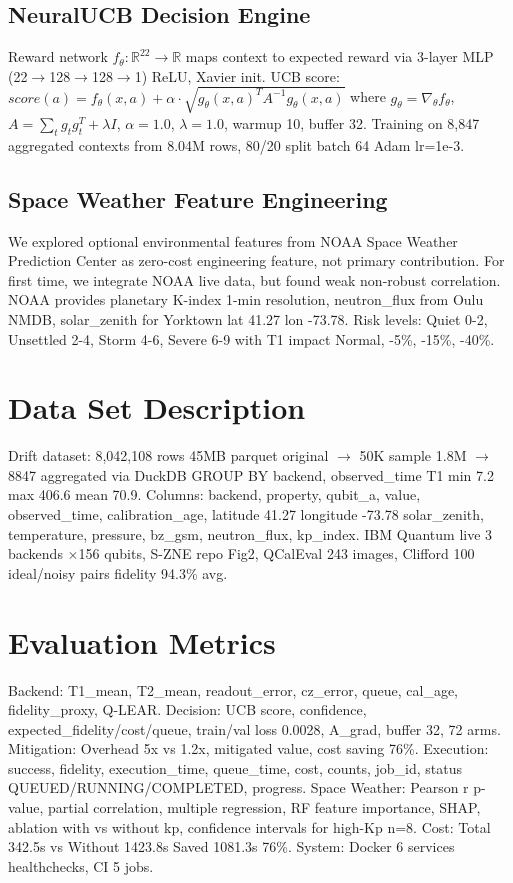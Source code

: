 \documentclass[conference]{IEEEtran}
\begin{document}
\subsection{NeuralUCB Decision Engine}
Reward network $f_\theta: \mathbb{R}^{22} \rightarrow \mathbb{R}$ maps context to expected reward via 3-layer MLP (22$\rightarrow$128$\rightarrow$128$\rightarrow$1) ReLU, Xavier init. UCB score: $score(a) = f_\theta(x,a) + \alpha \cdot \sqrt{g_\theta(x,a)^T A^{-1} g_\theta(x,a)}$ where $g_\theta = \nabla_\theta f_\theta$, $A = \sum_t g_t g_t^T + \lambda I$, $\alpha=1.0$, $\lambda=1.0$, warmup 10, buffer 32. Training on 8,847 aggregated contexts from 8.04M rows, 80/20 split batch 64 Adam lr=1e-3.

\subsection{Space Weather Feature Engineering}
We explored optional environmental features from NOAA Space Weather Prediction Center as zero-cost engineering feature, not primary contribution. For first time, we integrate NOAA live data, but found weak non-robust correlation. NOAA provides planetary K-index 1-min resolution, neutron\_flux from Oulu NMDB, solar\_zenith for Yorktown lat 41.27 lon -73.78. Risk levels: Quiet 0-2, Unsettled 2-4, Storm 4-6, Severe 6-9 with T1 impact Normal, -5\%, -15\%, -40\%.

\section{Data Set Description}
Drift dataset: 8,042,108 rows 45MB parquet original $\rightarrow$ 50K sample 1.8M $\rightarrow$ 8847 aggregated via DuckDB GROUP BY backend, observed\_time T1 min 7.2 max 406.6 mean 70.9. Columns: backend, property, qubit\_a, value, observed\_time, calibration\_age, latitude 41.27 longitude -73.78 solar\_zenith, temperature, pressure, bz\_gsm, neutron\_flux, kp\_index. IBM Quantum live 3 backends $\times$156 qubits, S-ZNE repo Fig2, QCalEval 243 images, Clifford 100 ideal/noisy pairs fidelity 94.3\% avg.

\section{Evaluation Metrics}
Backend: T1\_mean, T2\_mean, readout\_error, cz\_error, queue, cal\_age, fidelity\_proxy, Q-LEAR. Decision: UCB score, confidence, expected\_fidelity/cost/queue, train/val loss 0.0028, A\_grad, buffer 32, 72 arms. Mitigation: Overhead 5x vs 1.2x, mitigated value, cost saving 76\%. Execution: success, fidelity, execution\_time, queue\_time, cost, counts, job\_id, status QUEUED/RUNNING/COMPLETED, progress. Space Weather: Pearson r p-value, partial correlation, multiple regression, RF feature importance, SHAP, ablation with vs without kp, confidence intervals for high-Kp n=8. Cost: Total 342.5s vs Without 1423.8s Saved 1081.3s 76\%. System: Docker 6 services healthchecks, CI 5 jobs.
\end{document}
